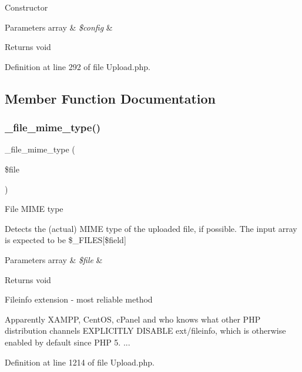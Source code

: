 Constructor


\begin{DoxyParams}[1]{Parameters}
array & {\em \$config} & \\
\hline
\end{DoxyParams}
\begin{DoxyReturn}{Returns}
void 
\end{DoxyReturn}


Definition at line 292 of file Upload.\+php.



\subsection{Member Function Documentation}
\mbox{\label{class_c_i___upload_a8ac4511eca70b271965b7f8ef00faf66}} 
\subsubsection{\texorpdfstring{\_file\_mime\_type()}{\_file\_mime\_type()}}
{\footnotesize\ttfamily \+\_\+file\+\_\+mime\+\_\+type (\begin{DoxyParamCaption}\item[{}]{\$file }\end{DoxyParamCaption})\hspace{0.3cm}{\ttfamily [protected]}}

File M\+I\+ME type

Detects the (actual) M\+I\+ME type of the uploaded file, if possible. The input array is expected to be \$\+\_\+\+F\+I\+L\+ES\mbox{[}\$field\mbox{]}


\begin{DoxyParams}[1]{Parameters}
array & {\em \$file} & \\
\hline
\end{DoxyParams}
\begin{DoxyReturn}{Returns}
void 
\end{DoxyReturn}
Fileinfo extension -\/ most reliable method

Apparently X\+A\+M\+PP, Cent\+OS, c\+Panel and who knows what other P\+HP distribution channels E\+X\+P\+L\+I\+C\+I\+T\+LY D\+I\+S\+A\+B\+LE ext/fileinfo, which is otherwise enabled by default since P\+HP 5. ...

Definition at line 1214 of file Upload.\+php.

